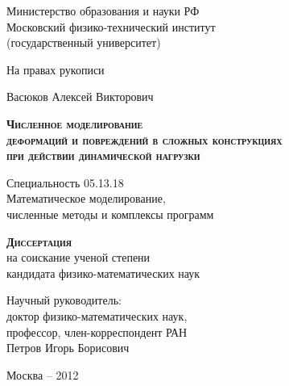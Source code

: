 \begin{titlepage}
\newpage

\begin{center}
Министерство образования и науки РФ\\
Московский физико-технический институт\\
(государственный университет)\\
\end{center}

\vspace{0.5em}

\begin{flushright}
На правах рукописи
\end{flushright}

\vspace{1em}

\begin{center}
Васюков Алексей Викторович
\end{center}

\vspace{1em}

\begin{center}
\textsc{\textbf{Численное моделирование\\
деформаций и повреждений в сложных конструкциях\\
при действии динамической нагрузки}}
\end{center}

\vspace{1.0em}

\begin{center}
Специальность 05.13.18\\
Математическое моделирование,\\
численные методы и комплексы программ
\end{center}

\vspace{0.5em}

\begin{center}
\textsc{\textbf{Диссертация}}\\
на соискание ученой степени\\
кандидата физико-математических наук
\end{center}

\vspace{1em}

\begin{flushright}
Научный руководитель:\\
доктор физико-математических наук,\\
профессор, член-корреспондент РАН\\
Петров Игорь Борисович
\end{flushright}

\vspace{\fill}
\begin{center}
Москва -- 2012
\end{center}

\end{titlepage}
